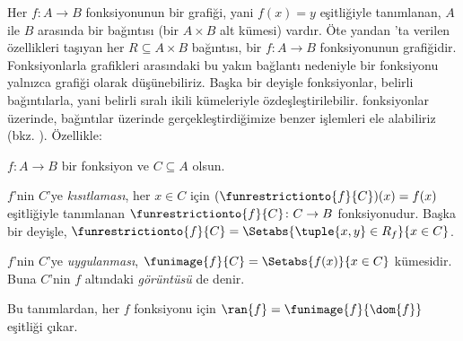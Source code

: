\documentclass[../../../include/open-logic-section]{subfiles}
\begin{document}
\begin{explain}
Her $f\colon A \to B$ fonksiyonunun bir grafiği, yani $f(x)=y$ eşitliğiyle
tanımlanan, $A$ ile $B$ arasında bir bağıntısı (bir $A\times B$ alt kümesi)
vardır. Öte yandan
'ta verilen özellikleri taşıyan her
$R \subseteq A \times B$ bağıntısı, bir $f \colon A \to B$ fonksiyonunun
grafiğidir. Fonksiyonlarla grafikleri arasındaki bu yakın bağlantı nedeniyle
bir fonksiyonu yalnızca grafiği olarak düşünebiliriz. Başka bir deyişle
fonksiyonlar, belirli bağıntılarla, yani belirli sıralı ikili kümeleriyle
özdeşleştirilebilir.  fonksiyonlar
üzerinde, bağıntılar üzerinde gerçekleştirdiğimize benzer işlemleri ele
alabiliriz (bkz. ). Özellikle:
\end{explain}

\begin{defn}
$f \colon A \to B$ bir fonksiyon ve $C\subseteq A$ olsun.

$f$'nin $C$'ye \emph{kısıtlaması}, her $x \in C$ için
$(\funrestrictionto{f}{C})(x)=f(x)$ eşitliğiyle tanımlanan
$\funrestrictionto{f}{C}\colon C \to B$ fonksiyonudur. Başka bir deyişle,
$\funrestrictionto{f}{C} = \Setabs{\tuple{x, y} \in R_f}{x \in C}$.

$f$'nin $C$'ye \emph{uygulanması}, $\funimage{f}{C} =
\Setabs{f(x)}{x \in C}$ kümesidir. Buna $C$'nin $f$ altındaki
\emph{görüntüsü} de denir.
\end{defn}

\begin{explain}
Bu tanımlardan, her $f$ fonksiyonu için $\ran{f} =
\funimage{f}{\dom{f}}$ eşitliği çıkar.
\end{explain}
\end{document}

